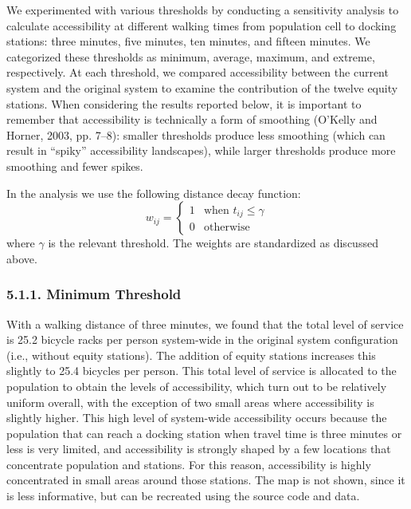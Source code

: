 \documentclass[]{elsarticle} %
\begin{document}
We experimented with various thresholds by conducting a sensitivity
analysis to calculate accessibility at different walking times from
population cell to docking stations: three minutes, five minutes, ten
minutes, and fifteen minutes. We categorized these thresholds as
minimum, average, maximum, and extreme, respectively. At each threshold,
we compared accessibility between the current system and the original
system to examine the contribution of the twelve equity stations. When
considering the results reported below, it is important to remember that
accessibility is technically a form of smoothing (O'Kelly and Horner,
2003, pp. 7--8): smaller thresholds produce less smoothing (which can
result in ``spiky'' accessibility landscapes), while larger thresholds
produce more smoothing and fewer spikes.

In the analysis we use the following distance decay function: \[
{w_{ij} = \begin{cases} 
      1 & \text{when } t_{ij}\leq \gamma \\
      0 & \text{otherwise} 
   \end{cases}}
\] \noindent where \(\gamma\) is the relevant threshold. The weights are
standardized as discussed above.

\hypertarget{minimum-threshold}{%
\subsubsection{5.1.1. Minimum Threshold}\label{minimum-threshold}}

With a walking distance of three minutes, we found that the total level
of service is 25.2 bicycle racks per person system-wide in the original
system configuration (i.e., without equity stations). The addition of
equity stations increases this slightly to 25.4 bicycles per person.
This total level of service is allocated to the population to obtain the
levels of accessibility, which turn out to be relatively uniform
overall, with the exception of two small areas where accessibility is
slightly higher. This high level of system-wide accessibility occurs
because the population that can reach a docking station when travel time
is three minutes or less is very limited, and accessibility is strongly
shaped by a few locations that concentrate population and stations. For
this reason, accessibility is highly concentrated in small areas around
those stations. The map is not shown, since it is less informative, but
can be recreated using the source code and data.
\end{document}
